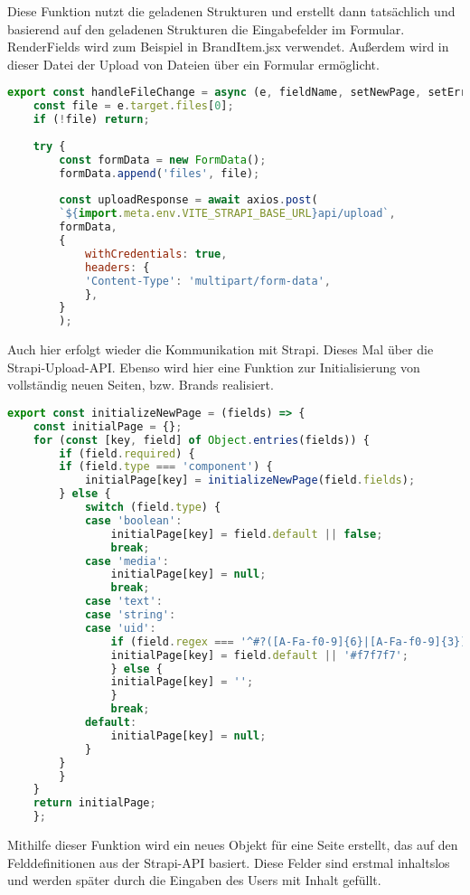 Diese Funktion nutzt die geladenen Strukturen und erstellt dann tatsächlich und basierend auf den geladenen Strukturen die Eingabefelder im Formular. RenderFields wird zum Beispiel in BrandItem.jsx verwendet.
Außerdem wird in dieser Datei der Upload von Dateien über ein Formular ermöglicht.

\begin{lstlisting}[language=JavaScript, caption={formutils.jsx Datei-Upload-Funktion}, label={lst:formutilsjsxDateiUpload}]
export const handleFileChange = async (e, fieldName, setNewPage, setError) => {
    const file = e.target.files[0];
    if (!file) return;
    
    try {
        const formData = new FormData();
        formData.append('files', file);
    
        const uploadResponse = await axios.post(
        `${import.meta.env.VITE_STRAPI_BASE_URL}api/upload`,
        formData,
        {
            withCredentials: true,
            headers: {
            'Content-Type': 'multipart/form-data',
            },
        }
        );
\end{lstlisting}

Auch hier erfolgt wieder die Kommunikation mit Strapi. Dieses Mal über die Strapi-Upload-API.
Ebenso wird hier eine Funktion zur Initialisierung von vollständig neuen Seiten, bzw. Brands realisiert.

\begin{lstlisting}[language=JavaScript, caption={formutils.jsx Neue Seite initialisieren}, label={lst:formutilsjsxNeueSeite}]
export const initializeNewPage = (fields) => {
    const initialPage = {};
    for (const [key, field] of Object.entries(fields)) {
        if (field.required) {
        if (field.type === 'component') {
            initialPage[key] = initializeNewPage(field.fields);
        } else {
            switch (field.type) {
            case 'boolean':
                initialPage[key] = field.default || false;
                break;
            case 'media':
                initialPage[key] = null;
                break;
            case 'text':
            case 'string':
            case 'uid':
                if (field.regex === '^#?([A-Fa-f0-9]{6}|[A-Fa-f0-9]{3})$') {
                initialPage[key] = field.default || '#f7f7f7';
                } else {
                initialPage[key] = '';
                }
                break;
            default:
                initialPage[key] = null;
            }
        }
        }
    }
    return initialPage;
    };
\end{lstlisting}

Mithilfe dieser Funktion wird ein neues Objekt für eine Seite erstellt, das auf den Felddefinitionen aus der Strapi-API basiert. Diese Felder sind erstmal inhaltslos und werden später durch die Eingaben des Users mit Inhalt gefüllt.
